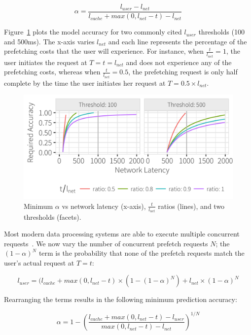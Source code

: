 $$\alpha = \frac{l_{user} - l_{net}}{l_{cache} + max(0, l_{net}-t) - l_{net}}$$

Figure~\ref{fig:model_base} plots the model accuracy for two commonly cited $l_{user}$ thresholds (100 and 500ms).  The x-axis varies $l_{net}$ and each line represents the percentage of the prefetching costs that the user will experience.  For instance, when $\frac{t}{l_{net}}=1$, the user initiates the request at $T=t=l_{net}$ and does not experience any of the prefetching costs, whereas when $\frac{t}{l_{net}}=0.5$, the prefetching request is only half complete by the time the user initiates her request at $T=0.5\times l_{net}$.

\begin{figure}[ht]
	\centering
	\includegraphics[width=1\columnwidth]{figures/model_base}
 	\caption{Minimum $\alpha$ vs network latency (x-axis), $\frac{t}{l_{net}}$ ratios (lines), and two thresholds (facets).}
    \label{fig:model_base}
\end{figure}



Most modern data processing systems are able to execute multiple concurrent requests~\cite{ebenstein2016fluxquery,giannikis2012shareddb}.  
We now vary the number of concurrent prefetch requests $N$;
the $(1-\alpha)^N$ term is the probability that none of the prefetch requests match the user's actual request at $T=t$:

$$l_{user} = (l_{cache} + max(0, l_{net} - t)\times (1-(1-\alpha)^N) + l_{net}\times(1-\alpha)^N $$

Rearranging the terms results in the following minimum prediction accuracy:


$$\alpha = 1 - \left(\frac{l_{cache}+max(0,l_{net}-t)-l_{user}}{max(0,l_{net}-t)-l_{net}}\right)^{1/N}$$

